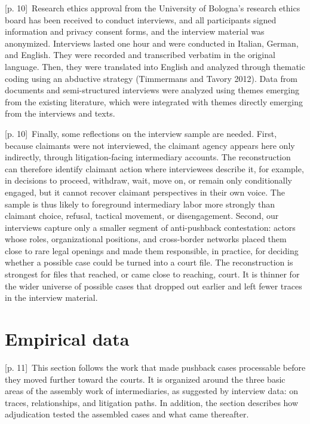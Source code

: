 \documentclass[10pt,a4paper]{article}
\begin{document}
{\scriptsize\color{gray} [p. 10]}\ Research ethics approval from the University of Bologna’s research ethics board has been received to conduct interviews, and all participants signed information and privacy consent forms, and the interview material was anonymized. Interviews lasted one hour and were conducted in Italian, German, and English. They were recorded and transcribed verbatim in the original language. Then, they were translated into English and analyzed through thematic coding using an abductive strategy (Timmermans and Tavory 2012). Data from documents and semi-structured interviews were analyzed using themes emerging from the existing literature, which were integrated with themes directly emerging from the interviews and texts.\par
{\scriptsize\color{gray} [p. 10]}\ Finally, some reflections on the interview sample are needed. First, because claimants were not interviewed, the claimant agency appears here only indirectly, through litigation-facing intermediary accounts. The reconstruction can therefore identify claimant action where interviewees describe it, for example, in decisions to proceed, withdraw, wait, move on, or remain only conditionally engaged, but it cannot recover claimant perspectives in their own voice. The sample is thus likely to foreground intermediary labor more strongly than claimant choice, refusal, tactical movement, or disengagement. Second, our interviews capture only a smaller segment of anti-pushback contestation: actors whose roles, organizational positions, and cross-border networks placed them close to rare legal openings and made them responsible, in practice, for deciding whether a possible case could be turned into a court file. The reconstruction is strongest for files that reached, or came close to reaching, court. It is thinner for the wider universe of possible cases that dropped out earlier and left fewer traces in the interview material.\par
{}\section*{Empirical data}
{\scriptsize\color{gray} [p. 11]}\ This section follows the work that made pushback cases processable before they moved further toward the courts. It is organized around the three basic areas of the assembly work of intermediaries, as suggested by interview data: on traces, relationships, and litigation paths. In addition, the section describes how adjudication tested the assembled cases and what came thereafter.\par
\end{document}
